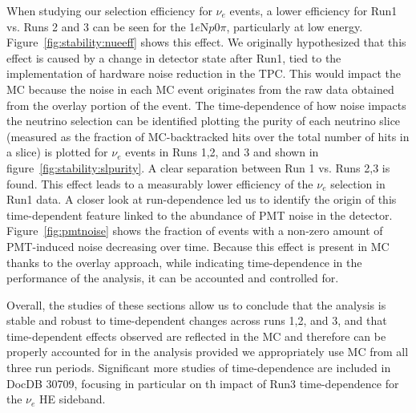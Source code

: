 \documentclass[a4paper]{article}
\newcommand{\nue}{$\nu_e$\xspace}
\newcommand{\npsel}{1$e$N$p$0$\pi$\xspace}
\begin{document}
When studying our selection efficiency for $\nu_e$ events, a lower efficiency for Run1 vs. Runs 2 and 3 can be seen for the \npsel, particularly at low energy. Figure~\ref{fig:stability:nueeff} shows this effect. We originally hypothesized that this effect is caused by a change in detector state after Run1, tied to the implementation of hardware noise reduction in the TPC. This would impact the MC because the noise in each MC event originates from the raw data obtained from the overlay portion of the event. The time-dependence of how noise impacts the neutrino selection can be identified plotting the purity of each neutrino slice (measured as the fraction of MC-backtracked hits over the total number of hits in a slice) is plotted for $\nu_e$ events in Runs 1,2, and 3 and shown in figure~\ref{fig:stability:slpurity}. A clear separation between Run 1 vs. Runs 2,3 is found. This effect leads to a measurably lower efficiency of the $\nu_e$ selection in Run1 data.
A closer look at run-dependence led us to identify the origin of this time-dependent feature linked to the abundance of PMT noise in the detector. Figure~\ref{fig:pmtnoise} shows the fraction of events with a non-zero amount of PMT-induced noise decreasing over time. Because this effect is present in MC thanks to the overlay approach, while indicating time-dependence in the performance of the analysis, it can be accounted and controlled for. 
\par Overall, the studies of these sections allow us to conclude that the analysis is stable and robust to time-dependent changes across runs 1,2, and 3, and that time-dependent effects observed are reflected in the MC and therefore can be properly accounted for in the analysis provided we appropriately use MC from all three run periods. Significant more studies of time-dependence are included in DocDB 30709, focusing in particular on th impact of Run3 time-dependence for the \nue HE sideband.
\end{document}
